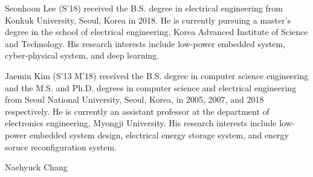 \documentclass[journal]{./template/IEEEtran}
\begin{document}
\begin{IEEEbiography}{Seonhoon Lee}
(S'18) received the B.S. degree in electrical engineering from Konkuk University, Seoul, Korea in 2018. He is currently pursuing a master’s degree in the school of electrical engineering, Korea Advanced Institute of Science and Technology. His research interests include low-power embedded system, cyber-physical system, and deep learning.
\end{IEEEbiography}

\begin{IEEEbiography}{Jaemin Kim}
(S'13 M'18) received the B.S. degree in computer science engineering and the M.S. and Ph.D. degrees in computer science and electrical engineering from Seoul National University, Seoul, Korea, in 2005, 2007, and 2018 respectively. He is currently an assistant professor at the department of electronics engineering, Myongji University. His research interests include low-power embedded system design, electrical energy storage system, and energy soruce reconfiguration system.
\end{IEEEbiography}

\begin{IEEEbiography}[{
}]{Naehyuck Chang}
\end{IEEEbiography}
\end{document}
